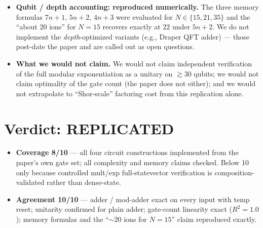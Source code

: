 \documentclass[11pt]{article}
\begin{document}
\begin{itemize}
  \item \textbf{Qubit / depth accounting: reproduced numerically.}
        The three memory formulas $7n{+}1$, $5n{+}2$, $4n{+}3$ were evaluated
        for $N \in \{15, 21, 35\}$ and the ``about 20 ions'' for $N{=}15$
        recovers exactly at $22$ under $5n{+}2$. We do not implement the
        \emph{depth}-optimized variants (e.g., Draper QFT adder) --- those
        post-date the paper and are called out as open questions.

  \item \textbf{What we would not claim.}
        We would not claim independent verification of the full modular
        exponentiation as a unitary on $\gtrsim\!30$ qubits; we would not
        claim optimality of the gate count (the paper does not either); and
        we would not extrapolate to ``Shor-scale'' factoring cost from this
        replication alone.
\end{itemize}

\section{Verdict: REPLICATED}
\begin{itemize}
  \item \textbf{Coverage 8/10} --- all four circuit constructions implemented
        from the paper's own gate set; all complexity and memory claims
        checked. Below 10 only because controlled mult/exp full-statevector
        verification is composition-validated rather than dense-state.
  \item \textbf{Agreement 10/10} --- adder / mod-adder exact on every input
        with temp reset; unitarity confirmed for plain adder; gate-count
        linearity exact ($R^{2} = 1.0$); memory formulas and the
        ``$\sim\!20$ ions for $N{=}15$'' claim reproduced exactly.
\end{itemize}


\end{document}
